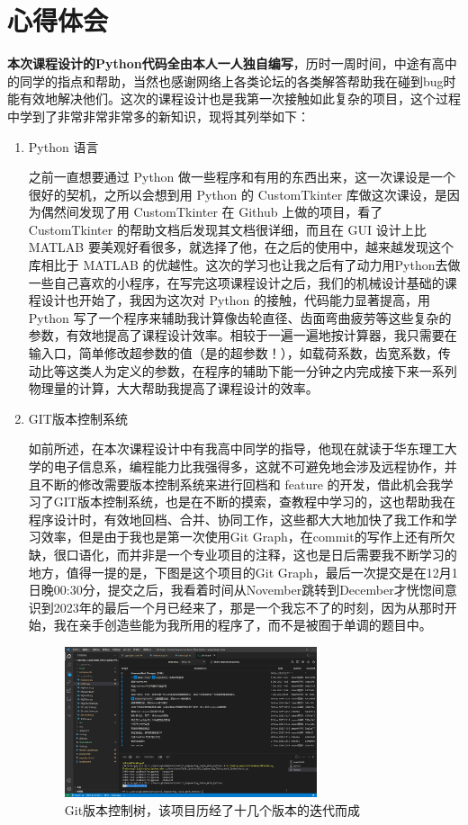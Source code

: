 \documentclass[12pt]{ctexart}
\begin{document}
\section{心得体会}

\textbf{本次课程设计的Python代码全由本人一人独自编写}，历时一周时间，中途有高中的同学的指点和帮助，当然也感谢网络上各类论坛的各类解答帮助我在碰到bug时能有效地解决他们。这次的课程设计也是我第一次接触如此复杂的项目，这个过程中学到了非常非常非常多的新知识，现将其列举如下：

\begin{enumerate}
	\item Python 语言

之前一直想要通过 Python 做一些程序和有用的东西出来，这一次课设是一个很好的契机，之所以会想到用 Python 的 CustomTkinter 库做这次课设，是因为偶然间发现了用 CustomTkinter 在 Github 上做的项目，看了 CustomTkinter 的帮助文档后发现其文档很详细，而且在 GUI 设计上比 MATLAB 要美观好看很多，就选择了他，在之后的使用中，越来越发现这个库相比于 MATLAB 的优越性。这次的学习也让我之后有了动力用Python去做一些自己喜欢的小程序，在写完这项课程设计之后，我们的机械设计基础的课程设计也开始了，我因为这次对 Python 的接触，代码能力显著提高，用 Python 写了一个程序来辅助我计算像齿轮直径、齿面弯曲疲劳等这些复杂的参数，有效地提高了课程设计效率。相较于一遍一遍地按计算器，我只需要在输入口，简单修改超参数的值（是的超参数！），如载荷系数，齿宽系数，传动比等这类人为定义的参数，在程序的辅助下能一分钟之内完成接下来一系列物理量的计算，大大帮助我提高了课程设计的效率。

	\item GIT版本控制系统

如前所述，在本次课程设计中有我高中同学的指导，他现在就读于华东理工大学的电子信息系，编程能力比我强得多，这就不可避免地会涉及远程协作，并且不断的修改需要版本控制系统来进行回档和 feature 的开发，借此机会我学习了GIT版本控制系统，也是在不断的摸索，查教程中学习的，这也帮助我在程序设计时，有效地回档、合并、协同工作，这些都大大地加快了我工作和学习效率，但是由于我也是第一次使用Git Graph，在commit的写作上还有所欠缺，很口语化，而并非是一个专业项目的注释，这也是日后需要我不断学习的地方，值得一提的是，下图是这个项目的Git Graph，最后一次提交是在12月1日晚00:30分，提交之后，我看着时间从November跳转到December才恍惚间意识到2023年的最后一个月已经来了，那是一个我忘不了的时刻，因为从那时开始，我在亲手创造些能为我所用的程序了，而不是被囿于单调的题目中。

\begin{figure}[htbp]
	\centering
	\includegraphics[width=0.7\textwidth]{img/GitGraph.png}
	\caption{Git版本控制树，该项目历经了十几个版本的迭代而成}
\end{figure}


\end{enumerate}
\end{document}
